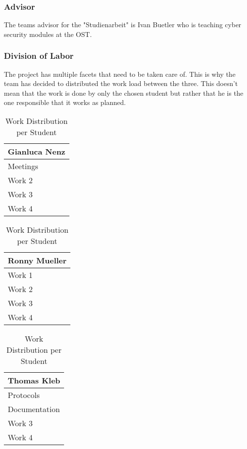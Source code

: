 \subsubsection*{Advisor}
The teams advisor for the "Studienarbeit" is Ivan Buetler who is teaching cyber security modules at the OST.

\subsubsection*{Division of Labor}
The project has multiple facets that need to be taken care of. This is why the team has decided to distributed the work load between the three. This doesn't mean that the work is done by only the chosen student but rather that he is the one responsible that it works as planned.
\begin{table}[H]
    \begin{tabular}[t]{||p{4cm}||}
        \hline
        Gianluca Nenz \\
        \hline\hline
        Meetings \\ 
        \hline
        Work 2 \\
        \hline
        Work 3 \\ 
        \hline
        Work 4\\[1ex] 
        \hline
    \end{tabular}
    \hfill
    \begin{tabular}[t]{||p{4cm}||}
        \hline
        Ronny Mueller \\
        \hline\hline
        Work 1 \\ 
        \hline
        Work 2 \\
        \hline
        Work 3 \\ 
        \hline
        Work 4\\[1ex] 
        \hline
    \end{tabular}
    \hfill
    \begin{tabular}[t]{||p{4cm}||}
        \hline
        Thomas Kleb \\
        \hline\hline
        Protocols \\ 
        \hline
        Documentation \\
        \hline
        Work 3 \\ 
        \hline
        Work 4\\[1ex] 
        \hline
    \end{tabular}
    \caption{Work Distribution per Student}
    \label{work_dis}
\end{table}

